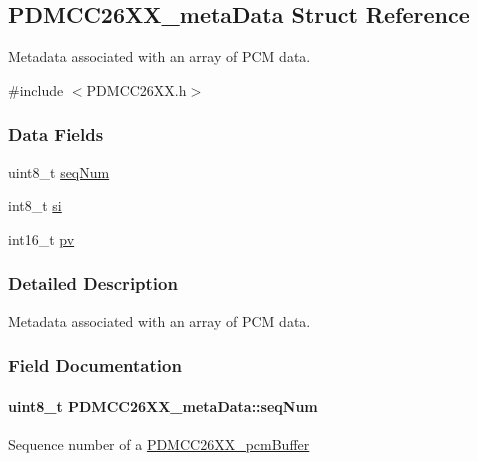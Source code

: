 \subsection{P\+D\+M\+C\+C26\+X\+X\+\_\+meta\+Data Struct Reference}
\label{struct_p_d_m_c_c26_x_x__meta_data}


Metadata associated with an array of P\+C\+M data.  




{\ttfamily \#include $<$P\+D\+M\+C\+C26\+X\+X.\+h$>$}

\subsubsection*{Data Fields}
\begin{DoxyCompactItemize}
\item 
uint8\+\_\+t \hyperlink{struct_p_d_m_c_c26_x_x__meta_data_aa7b19869f73f7a947e6cbdf61ff5c7a4}{seq\+Num}
\item 
int8\+\_\+t \hyperlink{struct_p_d_m_c_c26_x_x__meta_data_a817f693899137c53178f402eb5cbc459}{si}
\item 
int16\+\_\+t \hyperlink{struct_p_d_m_c_c26_x_x__meta_data_a3c221557847398149d1034d3d2a590b2}{pv}
\end{DoxyCompactItemize}


\subsubsection{Detailed Description}
Metadata associated with an array of P\+C\+M data. 

\subsubsection{Field Documentation}
\paragraph[{seq\+Num}]{\setlength{\rightskip}{0pt plus 5cm}uint8\+\_\+t P\+D\+M\+C\+C26\+X\+X\+\_\+meta\+Data\+::seq\+Num}\label{struct_p_d_m_c_c26_x_x__meta_data_aa7b19869f73f7a947e6cbdf61ff5c7a4}
Sequence number of a \hyperlink{struct_p_d_m_c_c26_x_x__pcm_buffer}{P\+D\+M\+C\+C26\+X\+X\+\_\+pcm\+Buffer} 
